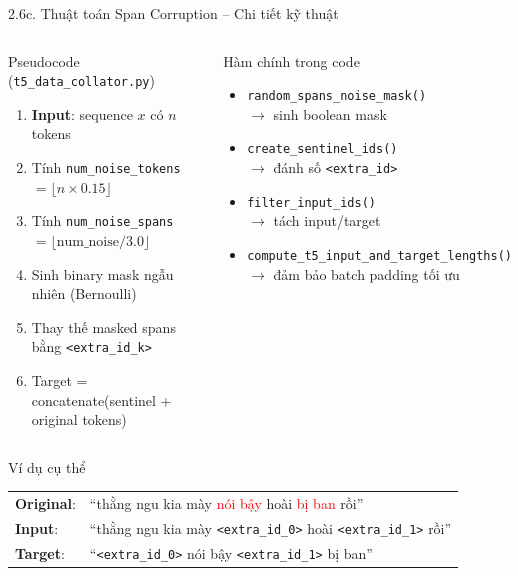 \documentclass[11pt, aspectratio=169]{beamer}
\begin{document}
\begin{frame}[fragile, shrink=10]{2.6c. Thuật toán Span Corruption -- Chi tiết kỹ thuật}

\begin{columns}[T]
  \begin{block}{Pseudocode (\texttt{t5\_data\_collator.py})}
    \begin{enumerate}
      \item \textbf{Input}: sequence $x$ có $n$ tokens
      \item Tính \texttt{num\_noise\_tokens} $= \lfloor n \times 0.15 \rfloor$
      \item Tính \texttt{num\_noise\_spans} $= \lfloor \text{num\_noise} / 3.0 \rfloor$
      \item Sinh binary mask ngẫu nhiên (Bernoulli)
      \item Thay thế masked spans bằng \texttt{<extra\_id\_k>}
      \item Target = concatenate(sentinel + original tokens)
    \end{enumerate}
  \end{block}

  \begin{block}{Hàm chính trong code}
    \begin{itemize}
      \item \texttt{random\_spans\_noise\_mask()}\\
        $\rightarrow$ sinh boolean mask
      \item \texttt{create\_sentinel\_ids()}\\
        $\rightarrow$ đánh số \texttt{<extra\_id>}
      \item \texttt{filter\_input\_ids()}\\
        $\rightarrow$ tách input/target
      \item \texttt{compute\_t5\_input\_and\_target\_lengths()}\\
        $\rightarrow$ đảm bảo batch padding tối ưu
    \end{itemize}
  \end{block}
\end{columns}

\vspace{0.3cm}
\begin{block}{Ví dụ cụ thể}
  \centering
  \begin{tabular}{ll}
    \textbf{Original}: & ``thằng ngu kia mày \textcolor{red}{nói bậy} hoài \textcolor{red}{bị ban} rồi'' \\
    \textbf{Input}: & ``thằng ngu kia mày \texttt{<extra\_id\_0>} hoài \texttt{<extra\_id\_1>} rồi'' \\
    \textbf{Target}: & ``\texttt{<extra\_id\_0>} nói bậy \texttt{<extra\_id\_1>} bị ban'' \\
  \end{tabular}
\end{block}
\end{frame}
\end{document}

